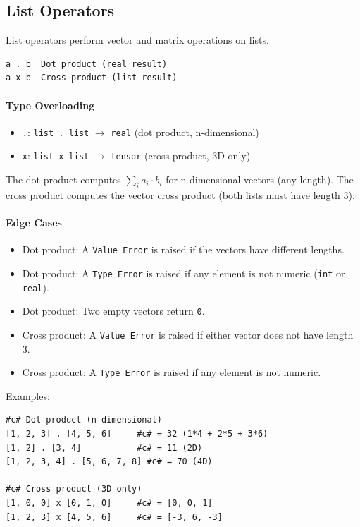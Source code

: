 \subsection{List Operators}
List operators perform vector and matrix operations on lists.
\begin{verbatim}
a . b  Dot product (real result)
a x b  Cross product (list result)
\end{verbatim}

\paragraph{Type Overloading}
\begin{itemize}
\item \texttt{.}: \texttt{list . list} $\rightarrow$ \texttt{real} (dot product, n-dimensional)
\item \texttt{x}: \texttt{list x list} $\rightarrow$ \texttt{tensor} (cross product, 3D only)
\end{itemize}

The dot product computes $\sum_{i} a_i \cdot b_i$ for n-dimensional vectors (any length). The cross product computes the vector cross product (both lists must have length 3).

\paragraph{Edge Cases}
\begin{itemize}
\item Dot product: A \texttt{Value Error} is raised if the vectors have different lengths.
\item Dot product: A \texttt{Type Error} is raised if any element is not numeric (\texttt{int} or \texttt{real}).
\item Dot product: Two empty vectors return \texttt{0}.
\item Cross product: A \texttt{Value Error} is raised if either vector does not have length 3.
\item Cross product: A \texttt{Type Error} is raised if any element is not numeric.
\end{itemize}

Examples:
\begin{verbatim}
#c# Dot product (n-dimensional)
[1, 2, 3] . [4, 5, 6]     #c# = 32 (1*4 + 2*5 + 3*6)
[1, 2] . [3, 4]           #c# = 11 (2D)
[1, 2, 3, 4] . [5, 6, 7, 8] #c# = 70 (4D)

#c# Cross product (3D only)
[1, 0, 0] x [0, 1, 0]     #c# = [0, 0, 1]
[1, 2, 3] x [4, 5, 6]     #c# = [-3, 6, -3]
\end{verbatim}

